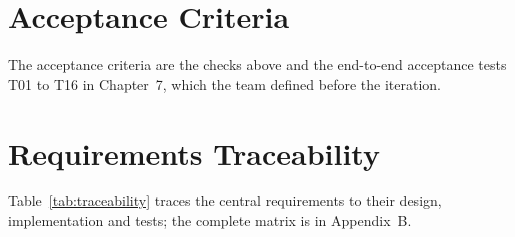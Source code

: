 \section{Acceptance Criteria}

The acceptance criteria are the checks above and the end-to-end acceptance tests T01 to T16 in Chapter~7, which the team defined before the iteration.

\section{Requirements Traceability}

Table~\ref{tab:traceability} traces the central requirements to their design, implementation and tests; the complete matrix is in Appendix~B.


